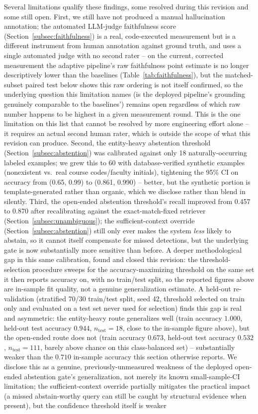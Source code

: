 \documentclass[a4paper,twoside]{article}
\begin{document}
Several limitations qualify these findings, some resolved during this revision and some still open. First, we still have not produced a manual hallucination annotation; the automated LLM-judge faithfulness score (Section~\ref{subsec:faithfulness}) is a real, code-executed measurement but is a different instrument from human annotation against ground truth, and uses a single automated judge with no second rater -- on the current, corrected measurement the adaptive pipeline's raw faithfulness point estimate is no longer descriptively lower than the baselines (Table~\ref{tab:faithfulness}), but the matched-subset paired test below shows this raw ordering is not itself confirmed, so the underlying question this limitation names (is the deployed pipeline's grounding genuinely comparable to the baselines') remains open regardless of which raw number happens to be highest in a given measurement round. This is the one limitation on this list that cannot be resolved by more engineering effort alone -- it requires an actual second human rater, which is outside the scope of what this revision can produce. Second, the entity-heavy abstention threshold (Section~\ref{subsec:abstention}) was calibrated against only 18 naturally-occurring labeled examples; we grew this to 60 with database-verified synthetic examples (nonexistent vs.\ real course codes/faculty initials), tightening the 95\% CI on accuracy from (0.65, 0.99) to (0.861, 0.990) -- better, but the synthetic portion is template-generated rather than organic, which we disclose rather than blend in silently. Third, the open-ended abstention threshold's recall improved from 0.457 to 0.870 after recalibrating against the exact-match-fixed retriever (Section~\ref{subsec:unambiguous}); the sufficient-context override (Section~\ref{subsec:abstention}) still only ever makes the system \emph{less} likely to abstain, so it cannot itself compensate for missed detections, but the underlying gate is now substantially more sensitive than before. A deeper methodological gap in this same calibration, found and closed this revision: the threshold-selection procedure sweeps for the accuracy-maximizing threshold on the same set it then reports accuracy on, with no train/test split, so the reported figures above are in-sample fit quality, not a genuine generalization estimate. A held-out re-validation (stratified 70/30 train/test split, seed 42, threshold selected on train only and evaluated on a test set never used for selection) finds this gap is real and asymmetric: the entity-heavy route generalizes well (train accuracy $1.000$, held-out test accuracy $0.944$, $n_{\mathrm{test}}=18$, close to the in-sample figure above), but the open-ended route does not (train accuracy $0.673$, held-out test accuracy $0.532$, $n_{\mathrm{test}}=111$, barely above chance on this class-balanced set) -- substantially weaker than the $0.710$ in-sample accuracy this section otherwise reports. We disclose this as a genuine, previously-unmeasured weakness of the deployed open-ended abstention gate's generalization, not merely its known small-sample-CI limitation; the sufficient-context override partially mitigates the practical impact (a missed abstain-worthy query can still be caught by structural evidence when present), but the confidence threshold itself is weaker 
\end{document}
